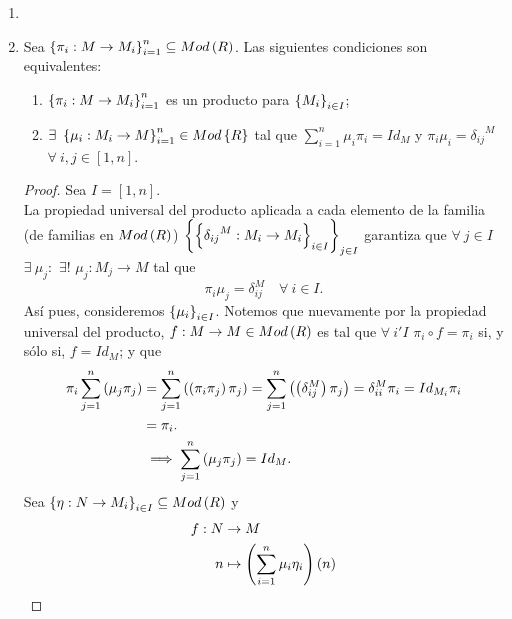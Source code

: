 \documentclass{article}
\begin{document}
\begin{enumerate}[label=\textbf{Ej \arabic*.}]
\begin{proof}
		$\boxed{\lrprth{b}\Rightarrow\lrprth{a}}$ Observe que $\lrbrack{Proy_{i}:\displaystyle\prod_{i \in I} M_{i} \longrightarrow M_{i}}_{i \in I}$ es una familia de morfismos en $Mod\lrprth{R}$. En virtud de que $P$ y $\lrbrack{\pi_{i}:P \longrightarrow M_{i}}_{i \in I}$ son un producto para $\arbtfam{M}{i}{I}$ , existe un único morfismo $\varphi:\displaystyle\prod_{i \in I} M_{i} \longrightarrow P$ tal que, para cada $i \in I$, $\pi_{i}\circ\varphi = Proy_{i}$. En vista de ésto, se concluye el resultado.
	\end{proof}
	\item 
	\item Sea $\left\{\pi_i:M\to M_i\right\}_{i=1}^n\subseteq Mod\left(R\right)$. Las siguientes condiciones son equivalentes:
	\begin{enumerate}[label=\alph*)]
		\item $\left\{\pi_i:M\to M_i\right\}_{i=1}^n$ es un producto para $\arbtfam{M}{i}{I}$;
		\item $\exists\ \left\{\mu_i:M_i\to M\right\}_{i=1}^n\in Mod\left\{R\right\}$ tal que $\sum_{i=1}^n\mu_i\pi_i=Id_M$ y $\pi_i\mu_i={\delta_{ij}}^M$ $\forall\ i,j\in[1,n]$.
	\end{enumerate}
	\begin{proof}
		Sea $I=[1,n]$.\\
		\boxed{\implies} La propiedad universal del producto aplicada a cada elemento de la familia (de familias en $Mod\lrprth{R}$) $\left\{\left\{{\delta_{ij}}^M:M_i\to M_i\right\}_{i\in I}\right\}_{j\in I}$ garantiza que $\forall\ j\in I$ $\exists\ \mu_j:$ $\exists !$ $\mu_j:M_j\to M$ tal que \begin{equation*}
			\pi_i\mu_j=\delta_{ij}^M\quad \forall\ i\in I.
		\end{equation*}
	Así pues, consideremos ${\left\{{\mu}_{i}\right\}}_{i\in I}$. Notemos que nuevamente por la propiedad universal del producto, $f:M\to M\in Mod\left(R\right)$ es tal que $\forall\ i' I$ $\pi_i\circ f=\pi_i$ si, y sólo si, $f=Id_M$; y que
	\begin{align*}
		\pi_i\sum_{j=1}^n\left(\mu_j\pi_j\right)&=\sum_{j=1}^n\left(\left(\pi_i\pi_j\right)\pi_j\right)=\sum_{j=1}^n\left(\left(\delta_{ij}^M\right)\pi_j\right)=\delta_{ii}^M\pi_i=Id_{M_i}\pi_i\\
		&=\pi_i.\\
		&\implies \sum_{j=1}^n\left(\mu_j\pi_j\right)=Id_M.
	\end{align*} 
	\boxed{\impliedby} Sea $\left\{\eta:N\to M_i\right\}_{i\in I}\subseteq Mod\left(R\right)$ y 
	\begin{align*}
		\descapp{f}{N}{M}{n}{\lrprth{\sum_{i=1}^n\mu_i\eta_i}\lrprth{n}}{}

\end{align*}
\end{proof}
\end{enumerate}
\end{document}
